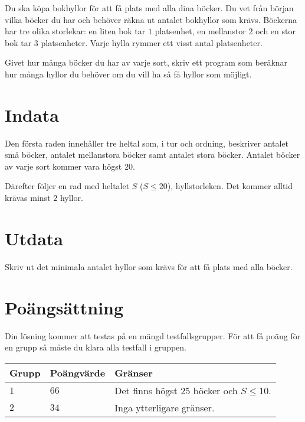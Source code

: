 Du ska köpa bokhyllor för att få plats med alla dina böcker.
Du vet från början vilka böcker du har och behöver räkna ut antalet bokhyllor som krävs.
Böckerna har tre olika storlekar: en liten bok tar $1$ platsenhet, en mellanstor $2$ och en stor bok tar $3$ platsenheter.
Varje hylla rymmer ett visst antal platsenheter.

Givet hur många böcker du har av varje sort, skriv ett program som beräknar hur många hyllor du behöver om du vill ha så få hyllor som möjligt.

\section*{Indata}
Den första raden innehåller tre heltal som, i tur och ordning, beskriver antalet små böcker, antalet mellanstora böcker samt antalet stora böcker.
Antalet böcker av varje sort kommer vara högst $20$.

Därefter följer en rad med heltalet $S$ ($S \le 20$), hyllstorleken.
Det kommer alltid krävas minst $2$ hyllor.

\section*{Utdata}
Skriv ut det minimala antalet hyllor som krävs för att få plats med alla böcker.

\section*{Poängsättning}
Din lösning kommer att testas på en mängd testfallsgrupper.
För att få poäng för en grupp så måste du klara alla testfall i gruppen.

\noindent
\begin{tabular}{| l | l | p{12cm} |}
  \hline
  Grupp & Poängvärde & Gränser \\ \hline
  $1$    & $66$        & Det finns högst $25$ böcker och $S \le 10$. \\ \hline 
  $2$    & $34$        & Inga ytterligare gränser. \\ \hline 
\end{tabular}

